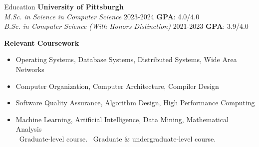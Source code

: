 \begin{rSection}{Education}
	\textbf{University of Pittsburgh}
	\\
	\textit{M.Sc. in Science in Computer Science}
	\hfill
	{2023-2024}
	\textbf{GPA}: 4.0/4.0
	\\
	\textit{B.Sc. in Computer Science (With Honors Distinction)}
	\hfill
	{2021-2023}
	\textbf{GPA}: 3.9/4.0
	    
	\textbf{Relevant Coursework}
	\begin{itemize}
		\item Operating Systems\textsuperscript{\textdaggerdbl}, Database Systems\textsuperscript{\textdaggerdbl}, Distributed Systems\textsuperscript{\textdagger}, Wide Area Networks\textsuperscript{\textdagger}
		\item Computer Organization, Computer Architecture\textsuperscript{\textdaggerdbl}, Compiler Design\textsuperscript{\textdagger}
		\item Software Quality Assurance, Algorithm Design\textsuperscript{\textdagger}, High Performance Computing\textsuperscript{\textdagger}
		\item Machine Learning, Artificial Intelligence\textsuperscript{\textdagger}, Data Mining\textsuperscript{\textdagger}, Mathematical Analysis
		\\
		\footnotesize{\textdagger\ Graduate-level course. \textdaggerdbl\ Graduate \& undergraduate-level course.}
	\end{itemize}
	    
\end{rSection}
